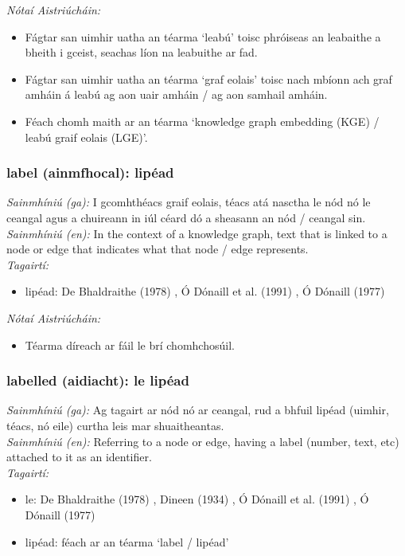  \noindent \textit{Nótaí Aistriúcháin:}
\begin{itemize}
	\item Fágtar san uimhir uatha an téarma `leabú' toisc phróiseas an leabaithe a bheith i gceist, seachas líon na leabuithe ar fad.
	\item Fágtar san uimhir uatha an téarma `graf eolais' toisc nach mbíonn ach graf amháin á leabú ag aon uair amháin / ag aon samhail amháin.
	\item Féach chomh maith ar an téarma `knowledge graph embedding (KGE) / leabú graif eolais (LGE)'.
\end{itemize}


\subsubsection*{label (ainmfhocal): lipéad}
 \noindent \textit{Sainmhíniú (ga):} I gcomhthéacs graif eolais, téacs atá nasctha le nód nó le ceangal agus a chuireann in iúl céard dó a sheasann an nód / ceangal sin.
\\
 \noindent \textit{Sainmhíniú (en):} In the context of a knowledge graph, text that is linked to a node or edge that indicates what that node / edge represents.
\\
 \noindent \textit{Tagairtí:}
\begin{itemize}
	\item lipéad: De Bhaldraithe (1978) \cite{de-bhaldraithe}, Ó Dónaill et al. (1991) \cite{focloir-beag}, Ó Dónaill (1977) \cite{odonaill}
\end{itemize}

 \noindent \textit{Nótaí Aistriúcháin:}
\begin{itemize}
	\item Téarma díreach ar fáil le brí chomhchosúil.
\end{itemize}


\subsubsection*{labelled (aidiacht): le lipéad}
 \noindent \textit{Sainmhíniú (ga):} Ag tagairt ar nód nó ar ceangal, rud a bhfuil lipéad (uimhir, téacs, nó eile) curtha leis mar shuaitheantas.
\\
 \noindent \textit{Sainmhíniú (en):} Referring to a node or edge, having a label (number, text, etc) attached to it as an identifier.
\\
 \noindent \textit{Tagairtí:}
\begin{itemize}
	\item le: De Bhaldraithe (1978) \cite{de-bhaldraithe}, Dineen (1934) \cite{dineen}, Ó Dónaill et al. (1991) \cite{focloir-beag}, Ó Dónaill (1977) \cite{odonaill}
	\item lipéad: féach ar an téarma `label / lipéad'
\end{itemize}

